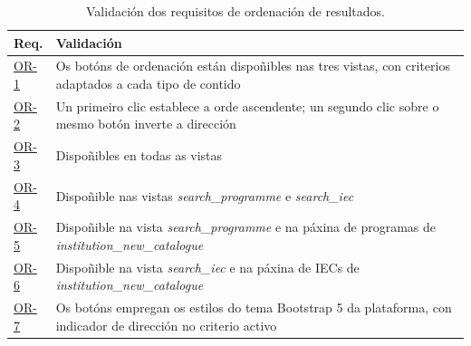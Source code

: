 \documentclass[%
    a4paper,               %
    twoside,               %
    10pt,                  %
]{article}                 %
\begin{document}
\begin{table}[h]
    \centering
    \begin{tabular}{p{1.5cm} p{\dimexpr\linewidth-1.5cm-4\tabcolsep\relax}}
        \hline
        \textbf{Req.}            & \textbf{Validación}                                                                                             \\
        \hline
        \hyperref[req:or1]{OR-1} & Os botóns de ordenación están dispoñibles nas tres vistas, con criterios adaptados a cada tipo de contido       \\
        \hyperref[req:or2]{OR-2} & Un primeiro clic establece a orde ascendente; un segundo clic sobre o mesmo botón inverte a dirección           \\
        \hyperref[req:or3]{OR-3} & Dispoñibles en todas as vistas                                                                                  \\
        \hyperref[req:or4]{OR-4} & Dispoñible nas vistas \textit{search\_programme} e \textit{search\_iec}                                         \\
        \hyperref[req:or5]{OR-5} & Dispoñible na vista \textit{search\_programme} e na páxina de programas de \textit{institution\_new\_catalogue} \\
        \hyperref[req:or6]{OR-6} & Dispoñible na vista \textit{search\_iec} e na páxina de IECs de \textit{institution\_new\_catalogue}            \\
        \hyperref[req:or7]{OR-7} & Os botóns empregan os estilos do tema Bootstrap 5 da plataforma, con indicador de dirección no criterio activo  \\
        \hline
    \end{tabular}
    \caption{Validación dos requisitos de ordenación de resultados.}
    \label{tab:validacion_ordenacion}
\end{table}
\end{document}
